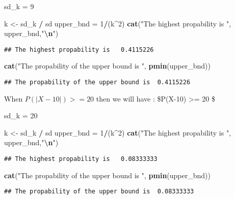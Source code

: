 \documentclass[
]{article}
\newenvironment{Shaded}{\begin{snugshade}}{\end{snugshade}}
\newcommand{\DecValTok}[1]{\textcolor[rgb]{0.00,0.00,0.81}{#1}}
\newcommand{\FunctionTok}[1]{\textcolor[rgb]{0.13,0.29,0.53}{\textbf{#1}}}
\newcommand{\NormalTok}[1]{#1}
\newcommand{\OtherTok}[1]{\textcolor[rgb]{0.56,0.35,0.01}{#1}}
\newcommand{\SpecialCharTok}[1]{\textcolor[rgb]{0.81,0.36,0.00}{\textbf{#1}}}
\newcommand{\StringTok}[1]{\textcolor[rgb]{0.31,0.60,0.02}{#1}}
\begin{document}
\begin{Shaded}
\begin{Highlighting}[]
\NormalTok{sd\_k  }\OtherTok{=} \DecValTok{9}

\NormalTok{k }\OtherTok{\textless{}{-}}\NormalTok{ sd\_k }\SpecialCharTok{/}\NormalTok{ sd}
\NormalTok{upper\_bnd }\OtherTok{=} \DecValTok{1}\SpecialCharTok{/}\NormalTok{(k}\SpecialCharTok{\^{}}\DecValTok{2}\NormalTok{)}
\FunctionTok{cat}\NormalTok{(}\StringTok{"The highest propability is  "}\NormalTok{, upper\_bnd,}\StringTok{"}\SpecialCharTok{\textbackslash{}n}\StringTok{"}\NormalTok{)}
\end{Highlighting}
\end{Shaded}

\begin{verbatim}
## The highest propability is   0.4115226
\end{verbatim}

\begin{Shaded}
\begin{Highlighting}[]
\FunctionTok{cat}\NormalTok{(}\StringTok{"The propability of the upper bound is "}\NormalTok{, }\FunctionTok{pmin}\NormalTok{(upper\_bnd))}
\end{Highlighting}
\end{Shaded}

\begin{verbatim}
## The propability of the upper bound is  0.4115226
\end{verbatim}

When \(P(|X-10|) >= 20\) then we will have : \$P(\textbar X-10\textbar)
\textgreater= 20 \le {} \$

\begin{Shaded}
\begin{Highlighting}[]
\NormalTok{sd\_k  }\OtherTok{=} \DecValTok{20} 

\NormalTok{k }\OtherTok{\textless{}{-}}\NormalTok{ sd\_k }\SpecialCharTok{/}\NormalTok{ sd}
\NormalTok{upper\_bnd }\OtherTok{=} \DecValTok{1}\SpecialCharTok{/}\NormalTok{(k}\SpecialCharTok{\^{}}\DecValTok{2}\NormalTok{)}
\FunctionTok{cat}\NormalTok{(}\StringTok{"The highest propability is  "}\NormalTok{, upper\_bnd,}\StringTok{"}\SpecialCharTok{\textbackslash{}n}\StringTok{"}\NormalTok{)}
\end{Highlighting}
\end{Shaded}

\begin{verbatim}
## The highest propability is   0.08333333
\end{verbatim}

\begin{Shaded}
\begin{Highlighting}[]
\FunctionTok{cat}\NormalTok{(}\StringTok{"The propability of the upper bound is "}\NormalTok{, }\FunctionTok{pmin}\NormalTok{(upper\_bnd))}
\end{Highlighting}
\end{Shaded}

\begin{verbatim}
## The propability of the upper bound is  0.08333333
\end{verbatim}
\end{document}
